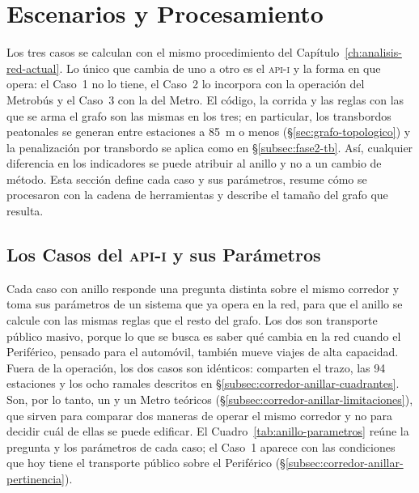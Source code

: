 %
%
\section{Escenarios y Procesamiento}
\label{sec:anillo-escenarios}

Los tres casos se calculan con el mismo procedimiento del
Capítulo~\ref{ch:analisis-red-actual}. Lo único que cambia de uno a otro es el
\textsc{api-i} y la forma en que opera: el Caso~1 no lo tiene, el Caso~2 lo
incorpora con la operación del Metrobús y el Caso~3 con la del Metro. El código,
la corrida y las reglas con las que se arma el grafo son las mismas en los tres;
en particular, los transbordos peatonales se generan entre estaciones a 85~m o
menos (§\ref{sec:grafo-topologico}) y la penalización por transbordo se aplica
como en §\ref{subsec:fase2-tb}. Así, cualquier diferencia en los indicadores se
puede atribuir al anillo y no a un cambio de método. Esta sección define cada
caso y sus parámetros, resume cómo se procesaron con la cadena de herramientas
y describe el tamaño del grafo que resulta.

\subsection{Los Casos del \textsc{api-i} y sus Parámetros}
\label{subsec:anillo-parametros}

Cada caso con anillo responde una pregunta distinta sobre el mismo corredor y
toma sus parámetros de un sistema que ya opera en la red, para que el anillo se
calcule con las mismas reglas que el resto del grafo. Los dos son transporte
público masivo, porque lo que se busca es saber qué cambia en la red cuando el
Periférico, pensado para el automóvil, también mueve viajes de alta capacidad.
Fuera de la operación, los dos casos son idénticos: comparten el trazo, las 94
estaciones y los ocho ramales descritos en
§\ref{subsec:corredor-anillar-cuadrantes}. Son, por lo tanto, un \brt{} y un
Metro teóricos (§\ref{subsec:corredor-anillar-limitaciones}), que sirven para
comparar dos maneras de operar el mismo corredor y no para decidir cuál de
ellas se puede edificar. El Cuadro~\ref{tab:anillo-parametros} reúne la
pregunta y los parámetros de cada caso; el Caso~1 aparece con las condiciones
que hoy tiene el transporte público sobre el Periférico
(§\ref{subsec:corredor-anillar-pertinencia}).

